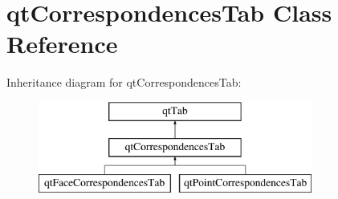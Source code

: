 \hypertarget{classqt_correspondences_tab}{}\section{qt\+Correspondences\+Tab Class Reference}
\label{classqt_correspondences_tab}
Inheritance diagram for qt\+Correspondences\+Tab\+:\begin{figure}[H]
\begin{center}
\leavevmode
\includegraphics[height=3.000000cm]{classqt_correspondences_tab}
\end{center}
\end{figure}
